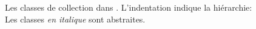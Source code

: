 \documentclass[a4paper,10pt,twoside]{book}
\begin{document}
\begin{figure}
\begin{center}
\ifluluelse
	{}
	{}
\caption{Les classes de collection dans \squeak. L'indentation indique la hi\'erarchie: Les classes \textit{\textsf{en italique}} sont abstraites.}
\label{fig:CollClassesList}
\end{center}
\end{figure}
\end{document}
